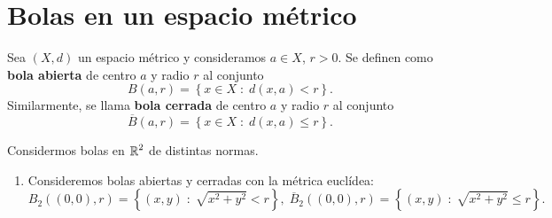 \section{Bolas en un espacio métrico}
\begin{definition}
Sea $\displaystyle \left(X, d\right) $ un espacio métrico y consideramos $\displaystyle a \in X $, $\displaystyle r > 0 $. Se definen como \textbf{bola abierta} de centro $\displaystyle a $ y radio $\displaystyle r $ al conjunto 
\[B\left(a,r\right) = \left\{ x \in X \; : \; d\left(x,a \right) < r\right\}  .\]
Similarmente, se llama \textbf{bola cerrada} de centro $\displaystyle a $ y radio $\displaystyle r $ al conjunto 
\[\overline{B}\left(a,r\right) = \left\{ x \in X \; : \; d\left(x,a\right) \leq r\right\}  .\]
\end{definition}
\begin{eg}
Considermos bolas en $\displaystyle \mathbb{R}^{2} $ de distintas normas. 
\begin{enumerate}
\item Consideremos bolas abiertas y cerradas con la métrica euclídea: 
	\[ B_{2}\left(\left(0,0\right), r\right) = \left\{ \left(x,y\right) \; : \; \sqrt{x ^{2} + y^{2}} < r\right\}, \; \overline{B}_{2}\left(\left(0,0\right), r\right) = \left\{ \left(x,y\right) \; : \; \sqrt{x^{2} +y^{2}} \leq r\right\}.\]
\begin{center}
\end{center}
\end{enumerate}
\end{eg}

